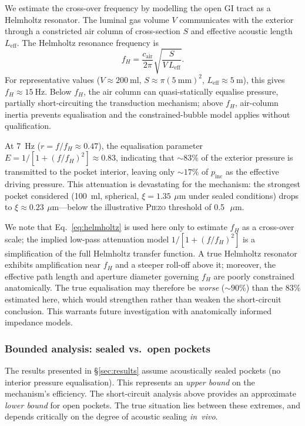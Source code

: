 \documentclass[12pt]{article}
\newcommand{\piezo}{\textsc{Piezo}}
\newcommand{\um}{\ensuremath{\,\mu\text{m}}}
\begin{document}
We estimate the cross-over frequency by modelling the open GI tract as a
Helmholtz resonator.  The luminal gas volume $V$ communicates with the
exterior through a constricted air column of cross-section $S$ and
effective acoustic length $L_\text{eff}$.  The Helmholtz resonance
frequency is
\begin{equation}
  f_H = \frac{c_\text{air}}{2\pi}\sqrt{\frac{S}{V\,L_\text{eff}}}.
  \label{eq:helmholtz}
\end{equation}
For representative values ($V \approx \SI{200}{\milli\litre}$,
$S \approx \pi(\SI{5}{\milli\metre})^2$, $L_\text{eff} \approx
\SI{5}{\metre}$), this gives $f_H \approx \SI{15}{\hertz}$.
Below $f_H$, the air column can quasi-statically equalise pressure,
partially short-circuiting the transduction mechanism; above $f_H$,
air-column inertia prevents equalisation and the constrained-bubble model
applies without qualification.

At \SI{7}{\hertz} ($r = f/f_H \approx 0.47$), the equalisation parameter
$E = 1/[1 + (f/f_H)^2] \approx 0.83$, indicating that ${\sim}83\%$ of the
exterior pressure is transmitted to the pocket interior, leaving only
${\sim}17\%$ of $p_\text{inc}$ as the effective driving pressure.  This
attenuation is devastating for the mechanism: the strongest pocket
considered (\SI{100}{\milli\litre}, spherical, $\xi = \SI{1.35}{\um}$
under sealed conditions) drops to $\xi \approx \SI{0.23}{\um}$---below the
illustrative \piezo{} threshold of \SI{0.5}{\um}.

We note that Eq.~\eqref{eq:helmholtz} is used here only to estimate
$f_H$ as a cross-over scale; the implied low-pass attenuation model
$1/[1+(f/f_H)^2]$ is a simplification of the full Helmholtz transfer
function.  A true Helmholtz resonator
exhibits amplification near $f_H$ and a steeper roll-off above it;
moreover, the effective path length and aperture diameter governing
$f_H$ are poorly constrained anatomically.
The true equalisation may therefore be \emph{worse} (${\sim}90\%$) than
the 83\% estimated here, which would strengthen rather than weaken
the short-circuit conclusion.  This warrants future investigation
with anatomically informed impedance models.

\subsubsection{Bounded analysis: sealed vs.\ open pockets}

The results presented in \S\ref{sec:results} assume acoustically sealed
pockets (no interior pressure equalisation).  This represents an
\emph{upper bound} on the mechanism's efficiency.  The short-circuit
analysis above provides an approximate \emph{lower bound} for open
pockets.  The true situation lies between these extremes, and
depends critically on the degree of acoustic sealing \emph{in~vivo}.
\end{document}
